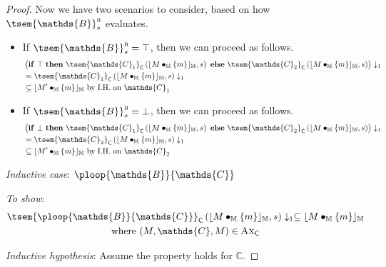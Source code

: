 {\begin{proof}
Now we have two scenarios to consider, based on how $\tsem{\mathds{B}}_s^\textsc{b}$ evaluates.
\begin{itemize}
	\item If $\tsem{\mathds{B}}_s^\textsc{b} = \top$, then we can proceed as follows.
		\begin{align*}			
			&\left( \mathbf{if}\ \top\ \mathbf{then}\ \tsem{\mathds{C}_1}_\mathsf{C}\left( \lfloor M \bullet_\mathbb{M} \{m\} \rfloor_\mathbb{M}, s \right)\ \mathbf{else}\ \tsem{\mathds{C}_2}_\mathsf{C}\left( \lfloor M \bullet_\mathbb{M} \{m\} \rfloor_\mathbb{M}, s \right) \right) \downarrow_1 \\
			&=
			\tsem{\mathds{C}_1}_\mathsf{C} \left( \lfloor M \bullet_\mathbb{M} \{m\} \rfloor_\mathbb{M}, s \right) \downarrow_1
			\\
			& \subseteq \lfloor M' \bullet_\mathbb{M} \{m\} \rfloor_\mathbb{M} \text{ by I.H. on } \mathds{C}_1
		\end{align*}
	\item If $\tsem{\mathds{B}}_s^\textsc{b} = \bot$, then we can proceed as follows.
		\begin{align*}			
			&\left( \mathbf{if}\ \bot\ \mathbf{then}\ \tsem{\mathds{C}_1}_\mathsf{C}\left( \lfloor M \bullet_\mathbb{M} \{m\} \rfloor_\mathbb{M}, s \right)\ \mathbf{else}\ \tsem{\mathds{C}_2}_\mathsf{C}\left( \lfloor M \bullet_\mathbb{M} \{m\} \rfloor_\mathbb{M}, s \right) \right) \downarrow_1 \\
			&=
			\tsem{\mathds{C}_2}_\mathsf{C} \left( \lfloor M \bullet_\mathbb{M} \{m\} \rfloor_\mathbb{M}, s \right) \downarrow_1
			\\
			& \subseteq \lfloor M' \bullet_\mathbb{M} \{m\} \rfloor_\mathbb{M} \text{ by I.H. on } \mathds{C}_2
		\end{align*}
\end{itemize}

\textit{Inductive case}: $\ploop{\mathds{B}}{\mathds{C}}$

\textit{To show}:
\begin{gather*}
	\tsem{\ploop{\mathds{B}}{\mathds{C}}}_\mathsf{C} \left( \lfloor M \bullet_\mathbb{M} \{m\} \rfloor_\mathbb{M}, s \right) \downarrow_1 \subseteq \lfloor M \bullet_\mathbb{M} \{m\} \rfloor_\mathbb{M}
	\\
	\text{where } (M, \mathds{C}, M) \in \textsc{Ax}_\mathsf{C}
\end{gather*}

\textit{Inductive hypothesis}: Assume the property holds for $\mathds{C}$.


\end{proof}}

